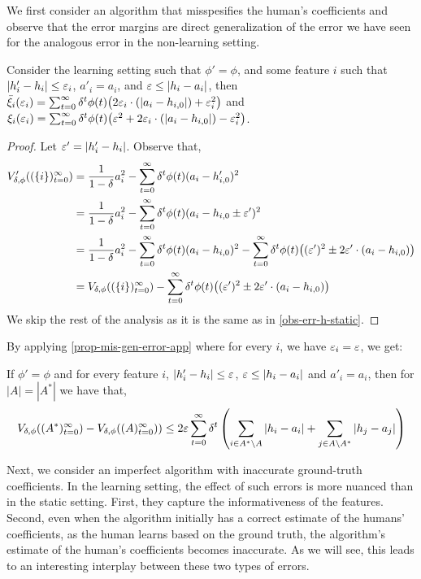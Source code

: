  We first consider an algorithm that misspesifies the human's coefficients and observe that the error margins are {direct generalization} of the error we have seen for the analogous error in the non-learning setting.
 \begin{observation} \label{obs-err-h-learning}
Consider the learning setting such that $\phi'=\phi$, and some feature $i$ such that $|h'_i-h_i|\leq \varepsilon_i$, $a'_i= a_i$, and $\varepsilon\leq|h_i-a_i|$, then $\bar \xi_i(\varepsilon_i)= \sum_{t=0}^\infty \delta^t \phi(t)\big(2\varepsilon_i \cdot (|a_i-h_{i,0}|) +\varepsilon_i^2 \big)$ and 
$\xi_i(\varepsilon_i)  = \sum_{t=0}^\infty \delta^t \phi(t)\big(\varepsilon^2 +  2\varepsilon_i \cdot (|a_i-h_{i,0}|) -\varepsilon_i^2 \big)$.
\end{observation}
\begin{proof}
    Let $\varepsilon'=|h'_i-h_i|$. Observe that,
    \begin{align*}
   V'_{\delta,\phi}((\{i\})_{t=0}^\infty) &=   \frac{1}{1-\delta}a_i^2 - \sum_{t=0}^\infty \delta^t \phi(t)(a_i-h'_{i,0})^2 \\
   &= \frac{1}{1-\delta}a_i^2 - \sum_{t=0}^\infty \delta^t \phi(t)(a_i-h_{i,0}\pm \varepsilon')^2 \\
   &= \frac{1}{1-\delta}a_i^2 - \sum_{t=0}^\infty \delta^t \phi(t)(a_i-h_{i,0})^2 -  \sum_{t=0}^\infty \delta^t \phi(t)\big((\varepsilon')^2 \pm  2\varepsilon' \cdot (a_i-h_{i,0}) \big) \\
   &= V_{\delta,\phi}((\{i\})_{t=0}^\infty) -  \sum_{t=0}^\infty \delta^t \phi(t)\big((\varepsilon')^2 \pm  2\varepsilon' \cdot (a_i-h_{i,0}) \big)
\end{align*}
We skip the rest of the analysis as it is the same as in \cref{obs-err-h-static}.


\end{proof}
By applying \cref{prop-mis-gen-error-app} where for every $i$, we have $\varepsilon_i=\varepsilon$, we get:
\begin{corollary}
If $\phi'=\phi$ and for every feature $i$, $|h'_i-h_i|\leq \varepsilon$,  $\varepsilon \leq |h_i-a_i|$ and $a'_i= a_i$, then for $|A|=|A^*|$ we have that,
\begin{align*}
    V_{\delta,\phi}((A^*)_{t=0}^\infty)-V_{\delta,\phi}((A)_{t=0}^\infty)) \leq    2\varepsilon\sum_{t=0}^\infty \delta^t \left( \sum_{i \in A^* \setminus A} |h_i-a_i| +  \sum_{j \in A \setminus A^*} |h_j-a_j| \right)
\end{align*}
\end{corollary}

Next, we consider an imperfect algorithm with inaccurate ground-truth coefficients. In the learning setting, the effect of such errors is more nuanced than in the static setting. First, they {capture} the informativeness of the {features}. Second, even when the algorithm initially has a correct estimate of the humans' coefficients, as the human learns based on the ground truth, the algorithm's estimate of the human's coefficients becomes inaccurate. As we will see, this leads to an interesting interplay between these two types of errors.

